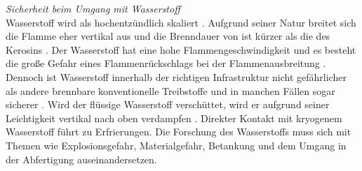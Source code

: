 %
%
%
\textit{Sicherheit beim Umgang mit Wasserstoff}\\
Wasserstoff wird als hochentzündlich skaliert \cite{dalmia2022powering}. Aufgrund seiner Natur breitet sich die Flamme eher 
vertikal aus und die Brenndauer von  ist kürzer als die des Kerosins \cite{colpan2022fuel}.
Der Wasserstoff hat eine hohe Flammengeschwindigkeit und es besteht die große Gefahr eines Flammenrückschlags bei der Flammenausbreitung \cite{khandelwal2013hydrogen}.
Dennoch ist Wasserstoff innerhalb der richtigen Infrastruktur nicht gefährlicher als andere brennbare konventionelle Treibstoffe und in manchen 
Fällen sogar sicherer \cite{khandelwal2013hydrogen}. 
Wird der flüssige Wasserstoff verschüttet, wird er aufgrund seiner Leichtigkeit vertikal nach oben verdampfen \cite{colpan2022fuel}. 
Direkter Kontakt mit kryogenem Wasserstoff führt zu Erfrierungen.
Die Forschung des Wasserstoffs muss sich mit Themen wie Explosionsgefahr, Materialgefahr, Betankung und 
dem Umgang in der Abfertigung auseinandersetzen. 

